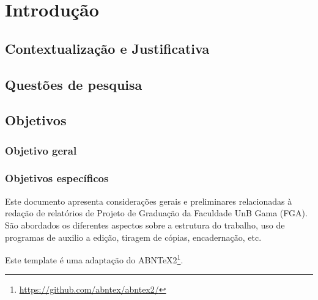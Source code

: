 \chapter[Introdução]{Introdução}
\section{Contextualização e Justificativa}
\section{Questões de pesquisa}
\section{Objetivos}
\subsection{Objetivo geral}
\subsection{Objetivos específicos}

Este documento apresenta considerações gerais e preliminares relacionadas 
à redação de relatórios de Projeto de Graduação da Faculdade UnB Gama 
(FGA). São abordados os diferentes aspectos sobre a estrutura do trabalho, 
uso de programas de auxilio a edição, tiragem de cópias, encadernação, etc.

Este template é uma adaptação do ABNTeX2\footnote{\url{https://github.com/abntex/abntex2/}}.
